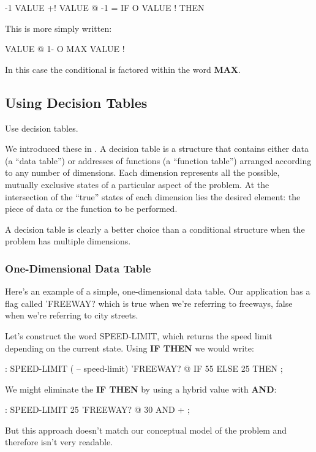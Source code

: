 \begin{Code}
-1 VALUE +!  VALUE @  -1 = IF  O VALUE !  THEN
\end{Code}
This is more simply written:

\begin{Code}
VALUE @  1-  O MAX  VALUE !
\end{Code}
In this case the conditional is factored within the word \textbf{MAX}.

\subsection{Using Decision Tables}

\begin{tip}
Use decision tables.
\end{tip}
We introduced these in . A decision table is a structure that
contains either data (a ``data table'') or addresses of functions (a
``function table'') arranged according to any number of dimensions. Each
dimension represents all the possible, mutually exclusive states of a
particular aspect of the problem. At the intersection of the ``true'' states
of each dimension lies the desired element: the piece of data or the function
to be performed.

A decision table is clearly a better choice than a conditional structure
when the problem has multiple dimensions.

\subsubsection{One-Dimensional Data Table}

Here's an example of a simple, one-dimensional data table. Our application
has a flag called 'FREEWAY? which is true when we're referring to
freeways, false when we're referring to city streets.

Let's construct the word SPEED-LIMIT, which returns the speed
limit depending on the current state. Using \textbf{IF THEN} we would write:

\begin{Code}
: SPEED-LIMIT  ( -- speed-limit)
     'FREEWAY? @  IF  55  ELSE  25  THEN ;
\end{Code}
We might eliminate the \textbf{IF THEN} by using a hybrid value with \textbf{AND}:

\begin{Code}
: SPEED-LIMIT   25  'FREEWAY? @  30 AND + ;
\end{Code}
But this approach doesn't match our conceptual model of the problem
and therefore isn't very readable.

